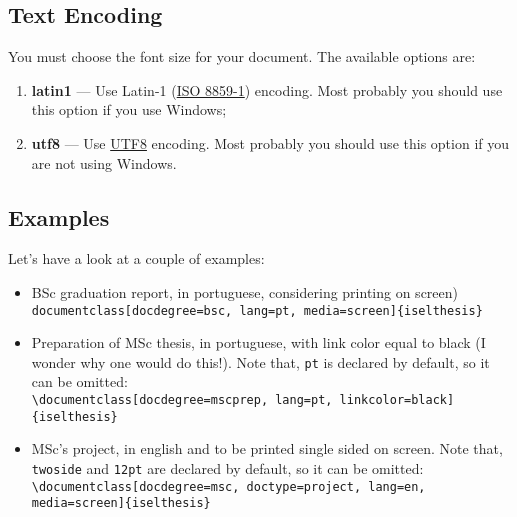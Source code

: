 \subsection{Text Encoding} %
\label{ssec:text_encoding}

You must choose the font size for your document. The available options are:
\begin{enumerate}
	\item \textbf{latin1} --- Use Latin-1 (\href{http://en.wikipedia.org/wiki/ISO/IEC_8859-1}{ISO 8859-1}) encoding.  Most probably you should use this option if you use Windows;
	\item \textbf{utf8} --- Use \href{http://en.wikipedia.org/wiki/UTF-8}{UTF8} encoding.    Most probably you should use this option if you are not using Windows.
\end{enumerate}

\subsection{Examples} %
\label{ssec:examples}

Let's have a look at a couple of examples:

\begin{itemize}
	\item BSc graduation report, in portuguese, considering printing on screen)\\
	\verb!documentclass[docdegree=bsc, lang=pt, media=screen]{iselthesis}!
	\item Preparation of MSc thesis, in portuguese, with link color equal to black (I wonder why one would do this!). Note that, \verb!pt! is declared by default, so it can be omitted: \\
	\verb!\documentclass[docdegree=mscprep, lang=pt, linkcolor=black]{iselthesis}!
	\item MSc's project, in english and to be printed single sided on screen. Note that, \verb!twoside! and \verb!12pt! are declared by default, so it can be omitted: \\
	\verb!\documentclass[docdegree=msc, doctype=project, lang=en, media=screen]{iselthesis}!
\end{itemize}


